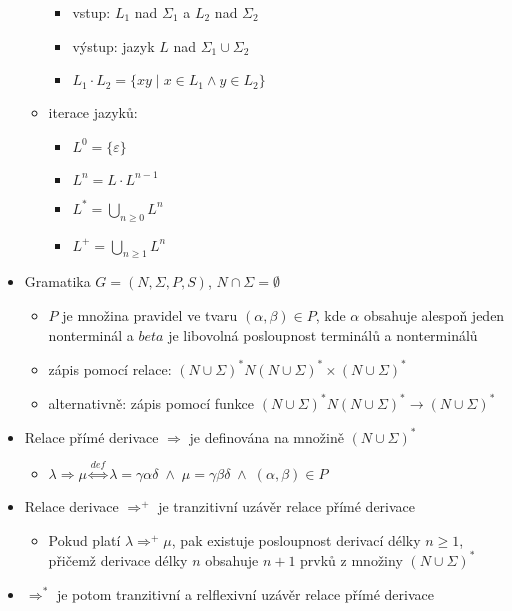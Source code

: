 \documentclass[a4paper, 12pt]{article}
\begin{document}
\begin{itemize}
\begin{itemize}
\begin{itemize}
			\item vstup: $L_1$ nad $\Sigma_1$ a $L_2$ nad $\Sigma_2$
			\item výstup: jazyk $L$ nad $\Sigma_1 \cup \Sigma_2$
			\item $L_1 \cdot L_2 = \lbrace xy \; | \; x \in L_1 \wedge y \in L_2 \rbrace$ 
		\end{itemize}
		\item iterace jazyků:
		\begin{itemize}
			\item $L^0 = \lbrace \varepsilon \rbrace$
			\item $L^n = L \cdot L^{n-1} $
			\item $L^* = \bigcup_{n \geq 0}L^n$
			\item $L^+ = \bigcup_{n \geq 1}L^n$
		\end{itemize}
	\end{itemize}
\item Gramatika $ G = (N, \Sigma, P,S)$, $N \cap \Sigma = \emptyset$
	\begin{itemize}
		\item $P$ je množina pravidel ve tvaru $(\alpha, \beta) \in P$, kde $\alpha$ obsahuje alespoň jeden nonterminál a $beta$ je libovolná posloupnost terminálů a nonterminálů
		\item zápis pomocí relace: $(N \cup \Sigma)^*N(N \cup \Sigma)^* \times (N \cup \Sigma)^*$
		\item alternativně: zápis pomocí funkce $(N \cup \Sigma)^*N(N \cup \Sigma)^* \rightarrow (N \cup \Sigma)^*$
	\end{itemize}
\item Relace přímé derivace $\Rightarrow$ je definována na množině $(N \cup \Sigma)^*$
\begin{itemize}
	\item $ \lambda \Rightarrow \mu  \overset{def}{\Longleftrightarrow} \lambda = \gamma \alpha \delta \; \wedge \; \mu = \gamma \beta \delta \; \wedge \; (\alpha, \beta) \in P$ 
\end{itemize}
\item Relace derivace $\Rightarrow^+$ je tranzitivní uzávěr relace přímé derivace
\begin{itemize}
	\item Pokud platí $\lambda \Rightarrow^+ \mu $, pak existuje posloupnost derivací délky $n \geq 1$, přičemž derivace délky $n$ obsahuje $n+1$ prvků z množiny  $(N \cup \Sigma)^*$
\end{itemize}
\item $\Rightarrow^*$ je potom tranzitivní a relflexivní uzávěr relace přímé derivace

\end{itemize}
\end{document}
